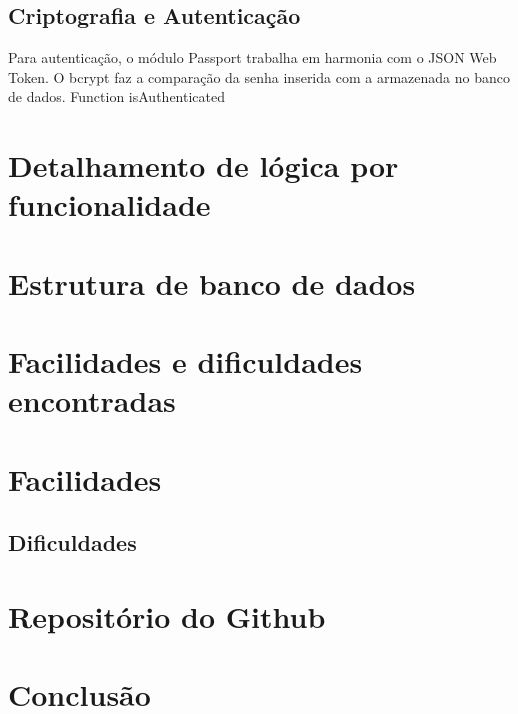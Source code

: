 \documentclass[ ]{article}
\begin{document}
			
		\subsection{Criptografia e Autenticação}
		Para autenticação, o módulo Passport trabalha em harmonia com o JSON Web Token. O bcrypt faz a comparação da senha inserida com a armazenada no banco de dados.
		Function isAuthenticated

	\section{Detalhamento de lógica por funcionalidade}
	\section{Estrutura de banco de dados}
	\section{Facilidades e dificuldades encontradas}
		\section{Facilidades}
		\subsection{Dificuldades}
	\section{Repositório do Github}
	\section{Conclusão}
	
\end{document}
